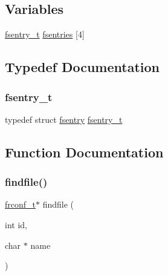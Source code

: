 \subsection*{Variables}
\begin{DoxyCompactItemize}
\item 
\hyperlink{a00152_a9ccf6560e8aebea3e4402a31e8c0f46b_a9ccf6560e8aebea3e4402a31e8c0f46b}{fsentry\+\_\+t} \hyperlink{a00152_a6b46131164b26e476762930c9aae4319_a6b46131164b26e476762930c9aae4319}{fsentries} \mbox{[}4\mbox{]}
\end{DoxyCompactItemize}


\subsection{Typedef Documentation}
\mbox{\label{a00152_a9ccf6560e8aebea3e4402a31e8c0f46b_a9ccf6560e8aebea3e4402a31e8c0f46b}} 
\subsubsection{\texorpdfstring{fsentry\+\_\+t}{fsentry\_t}}
{\footnotesize\ttfamily typedef struct \hyperlink{a00272}{fsentry}  \hyperlink{a00152_a9ccf6560e8aebea3e4402a31e8c0f46b_a9ccf6560e8aebea3e4402a31e8c0f46b}{fsentry\+\_\+t}}



\subsection{Function Documentation}
\mbox{\label{a00152_a5c15724e6f3ef2c0df67ccedfc8639eb_a5c15724e6f3ef2c0df67ccedfc8639eb}} 
\subsubsection{\texorpdfstring{findfile()}{findfile()}}
{\footnotesize\ttfamily \hyperlink{a00191_a752f1bef3c13b98d682fddc44a9e47c8_a752f1bef3c13b98d682fddc44a9e47c8}{frconf\+\_\+t}$\ast$ findfile (\begin{DoxyParamCaption}\item[{int}]{id,  }\item[{char $\ast$}]{name }\end{DoxyParamCaption})}



